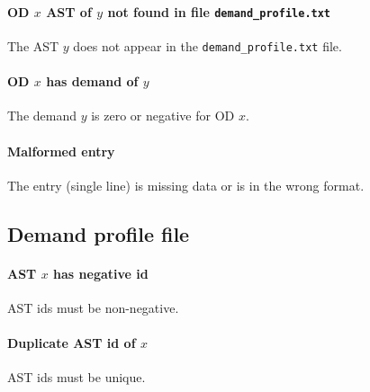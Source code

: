\paragraph*{OD $x$ AST of $y$ not found in file \texttt{demand\_profile.txt}}
The AST $y$ does not appear in the \texttt{demand\_profile.txt} file.

\paragraph*{OD $x$ has demand of $y$}
The demand $y$ is zero or negative for OD $x$.

\paragraph*{Malformed entry}
The entry (single line) is missing data or is in the wrong format.

\subsection{Demand profile file}

\paragraph*{AST $x$ has negative id}
AST ids must be non-negative.

\paragraph*{Duplicate AST id of $x$}
AST ids must be unique.


